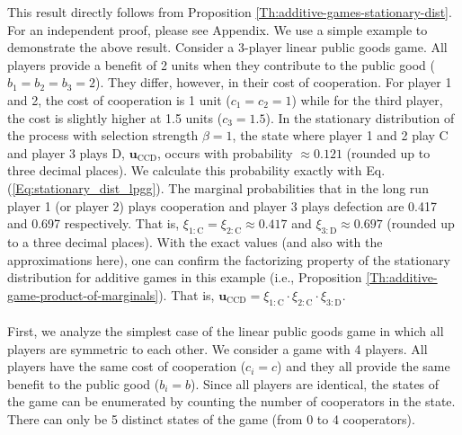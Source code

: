 \documentclass[11pt]{article}
\theoremstyle{plainCl1}
\theoremstyle{plainCl2}
\newcommand{\ubf}{\mathbf{u}}
\newcommand{\C}{\mathrm{C}}
\newcommand{\D}{\mathrm{D}}
\begin{document}
\noindent This result directly follows from Proposition \ref{Th:additive-games-stationary-dist}. For an independent proof, please see Appendix. We use a simple example to demonstrate the above result. Consider a 3-player linear public goods game. All players provide a benefit of 2 units when they contribute to the public good ($b_1 = b_2 = b_3 = 2$). They differ, however, in their cost of cooperation. For player 1 and 2, the cost of cooperation is 1 unit ($c_1 = c_2 = 1$) while for the third player, the cost is slightly higher at 1.5 units ($c_3 = 1.5$). In the stationary distribution of the process with selection strength $\beta = 1$, the state where player 1 and 2 play $\C$ and player 3 plays $\D$, $\ubf_{\C\C\D}$, occurs with probability $\approx 0.121$ (rounded up to three decimal places). We calculate this probability exactly with Eq. (\ref{Eq:stationary_dist_lpgg}). The marginal probabilities that in the long run player 1 (or player 2) plays cooperation and player 3 plays defection are 0.417 and 0.697 respectively. That is, $\xi_{1:\C} = \xi_{2:\C} \approx 0.417$ and $\xi_{3:\D} \approx 0.697$ (rounded up to a three decimal places). With the exact values (and also with the approximations here), one can confirm the factorizing property of the stationary distribution for additive games in this example (i.e., Proposition \ref{Th:additive-game-product-of-marginals}). That is, $\ubf_{\C\C\D} = \xi_{1:\C} \cdot \xi_{2:\C} \cdot \xi_{3:\D}$. \\ \\
\noindent First, we analyze the simplest case of the linear public goods game in which all players are symmetric to each other. We consider a game with 4 players. All players have the same cost of cooperation ($c_i = c$) and they all provide the same benefit to the public good ($b_i = b$). Since all players are identical, the states of the game can be enumerated by counting the number of cooperators in the state. There can only be 5 distinct states of the game (from 0 to 4 cooperators).
\end{document}
